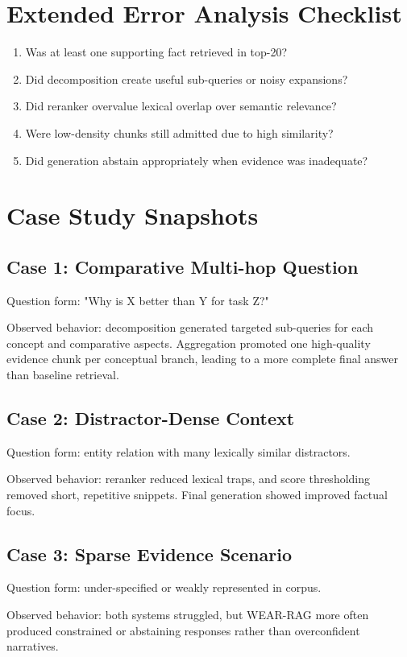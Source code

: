 \documentclass[10pt,draftclsnofoot,onecolumn,journal]{IEEEtran}
\begin{document}
\section{Extended Error Analysis Checklist}
\begin{enumerate}
\item Was at least one supporting fact retrieved in top-20?
\item Did decomposition create useful sub-queries or noisy expansions?
\item Did reranker overvalue lexical overlap over semantic relevance?
\item Were low-density chunks still admitted due to high similarity?
\item Did generation abstain appropriately when evidence was inadequate?
\end{enumerate}

\section{Case Study Snapshots}
\subsection{Case 1: Comparative Multi-hop Question}
Question form: "Why is X better than Y for task Z?"

Observed behavior: decomposition generated targeted sub-queries for each concept and comparative aspects. Aggregation promoted one high-quality evidence chunk per conceptual branch, leading to a more complete final answer than baseline retrieval.

\subsection{Case 2: Distractor-Dense Context}
Question form: entity relation with many lexically similar distractors.

Observed behavior: reranker reduced lexical traps, and score thresholding removed short, repetitive snippets. Final generation showed improved factual focus.

\subsection{Case 3: Sparse Evidence Scenario}
Question form: under-specified or weakly represented in corpus.

Observed behavior: both systems struggled, but WEAR-RAG more often produced constrained or abstaining responses rather than overconfident narratives.
\end{document}
